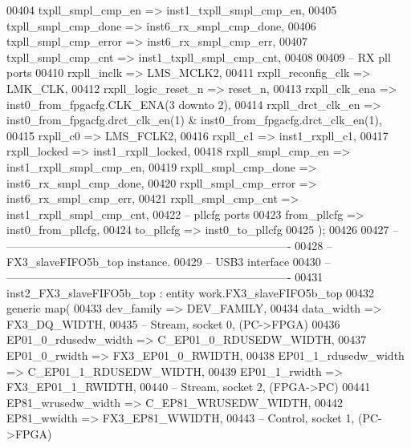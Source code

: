 \begin{DoxyCode}
00404       txpll_smpl_cmp_en    => inst1_txpll_smpl_cmp_en,
00405       txpll_smpl_cmp_done  => inst6_rx_smpl_cmp_done,
00406       txpll_smpl_cmp_error => inst6_rx_smpl_cmp_err,
00407       txpll_smpl_cmp_cnt   => inst1_txpll_smpl_cmp_cnt,
00408 
00409 \textcolor{keyword}{      -- RX pll ports}
00410       rxpll_inclk          => LMS_MCLK2,
00411       rxpll_reconfig_clk   => LMK_CLK,
00412       rxpll_logic_reset_n  => reset_n,
00413       rxpll_clk_ena        => inst0\_from\_fpgacfg.CLK\_ENA\textcolor{vhdlchar}{(}\textcolor{vhdllogic}{3} \textcolor{keywordflow}{downto} \textcolor{vhdllogic}{2}\textcolor{vhdlchar}{)},
00414       rxpll_drct_clk_en    => inst0\_from\_fpgacfg.drct\_clk\_en\textcolor{vhdlchar}{(}\textcolor{vhdllogic}{1}\textcolor{vhdlchar}{)} & 
      inst0_from_fpgacfg.drct_clk_en\textcolor{vhdlchar}{(}\textcolor{vhdllogic}{1}\textcolor{vhdlchar}{)},
00415       rxpll_c0             => LMS_FCLK2,
00416       rxpll_c1             => inst1_rxpll_c1,
00417       rxpll_locked         => inst1_rxpll_locked,
00418       rxpll_smpl_cmp_en    => inst1_rxpll_smpl_cmp_en,      
00419       rxpll_smpl_cmp_done  => inst6_rx_smpl_cmp_done,
00420       rxpll_smpl_cmp_error => inst6_rx_smpl_cmp_err,
00421       rxpll_smpl_cmp_cnt   => inst1_rxpll_smpl_cmp_cnt,       
00422 \textcolor{keyword}{      -- pllcfg ports}
00423       from_pllcfg          => inst0_from_pllcfg,
00424       to_pllcfg            => inst0_to_pllcfg
00425    \textcolor{vhdlchar}{)};
00426       
00427 \textcolor{keyword}{-- ----------------------------------------------------------------------------}
00428 \textcolor{keyword}{-- FX3\_slaveFIFO5b\_top instance.}
00429 \textcolor{keyword}{-- USB3 interface }
00430 \textcolor{keyword}{-- ----------------------------------------------------------------------------}
00431    inst2\_FX3\_slaveFIFO5b\_top : \textcolor{keywordflow}{entity} work.FX3_slaveFIFO5b_top
00432    \textcolor{keywordflow}{generic} \textcolor{keywordflow}{map}(
00433       dev_family           => DEV_FAMILY,
00434       data_width           => FX3_DQ_WIDTH,
00435 \textcolor{keyword}{      -- Stream, socket 0, (PC->FPGA) }
00436       EP01\_0\_rdusedw\_width => C_EP01_0_RDUSEDW_WIDTH,
00437       EP01\_0\_rwidth        => FX3_EP01_0_RWIDTH,
00438       EP01\_1\_rdusedw\_width => C_EP01_1_RDUSEDW_WIDTH,
00439       EP01\_1\_rwidth        => FX3_EP01_1_RWIDTH,
00440 \textcolor{keyword}{      -- Stream, socket 2, (FPGA->PC)}
00441       EP81_wrusedw_width    => C_EP81_WRUSEDW_WIDTH,
00442       EP81_wwidth               => FX3_EP81_WWIDTH,
00443 \textcolor{keyword}{      -- Control, socket 1, (PC->FPGA)}

\end{DoxyCode}
